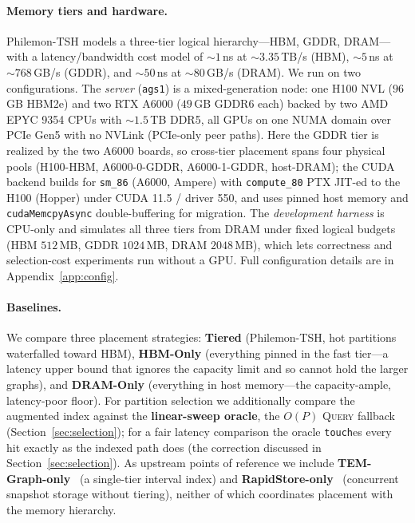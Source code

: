 \documentclass[10pt]{article}
\theoremstyle{definition}
\begin{document}
\paragraph{Memory tiers and hardware.}
Philemon-TSH models a three-tier logical hierarchy---HBM, GDDR, DRAM---with a
latency/bandwidth cost model of ${\sim}1$\,ns at ${\sim}3.35$\,TB/s (HBM),
${\sim}5$\,ns at ${\sim}768$\,GB/s (GDDR), and ${\sim}50$\,ns at ${\sim}80$\,GB/s
(DRAM). We run on two configurations. The \emph{server} (\texttt{ags1}) is a
mixed-generation node: one H100 NVL ($96$\,GB HBM2e) and two RTX A6000 ($49$\,GB
GDDR6 each) backed by two AMD EPYC 9354 CPUs with ${\sim}1.5$\,TB DDR5, all GPUs on
one NUMA domain over PCIe Gen5 with no NVLink (PCIe-only peer paths). Here the GDDR
tier is realized by the two A6000 boards, so cross-tier placement spans four
physical pools (H100-HBM, A6000-0-GDDR, A6000-1-GDDR, host-DRAM); the CUDA backend
builds for \texttt{sm\_86} (A6000, Ampere) with \texttt{compute\_80} PTX JIT-ed to
the H100 (Hopper) under CUDA 11.5 / driver 550, and uses pinned host memory and
\texttt{cudaMemcpyAsync} double-buffering for migration. The \emph{development
harness} is CPU-only and simulates all three tiers from DRAM under fixed logical
budgets (HBM $512$\,MB, GDDR $1024$\,MB, DRAM $2048$\,MB), which lets correctness and
selection-cost experiments run without a GPU. Full configuration details are in
Appendix~\ref{app:config}.

\paragraph{Baselines.}
We compare three placement strategies: \textbf{Tiered} (Philemon-TSH, hot
partitions waterfalled toward HBM), \textbf{HBM-Only} (everything pinned in the fast
tier---a latency upper bound that ignores the capacity limit and so cannot hold the
larger graphs), and \textbf{DRAM-Only} (everything in host memory---the
capacity-ample, latency-poor floor). For partition selection we additionally compare
the augmented index against the \textbf{linear-sweep oracle}, the $O(P)$
\textsc{Query} fallback (Section~\ref{sec:selection}); for a fair latency comparison
the oracle \texttt{touch}es every hit exactly as the indexed path does (the
correction discussed in Section~\ref{sec:selection}). As upstream points of
reference we include \textbf{TEM-Graph-only}~\citep{temgraph} (a single-tier
interval index) and \textbf{RapidStore-only}~\citep{rapidstore} (concurrent snapshot
storage without tiering), neither of which coordinates placement with the memory
hierarchy.
\end{document}
